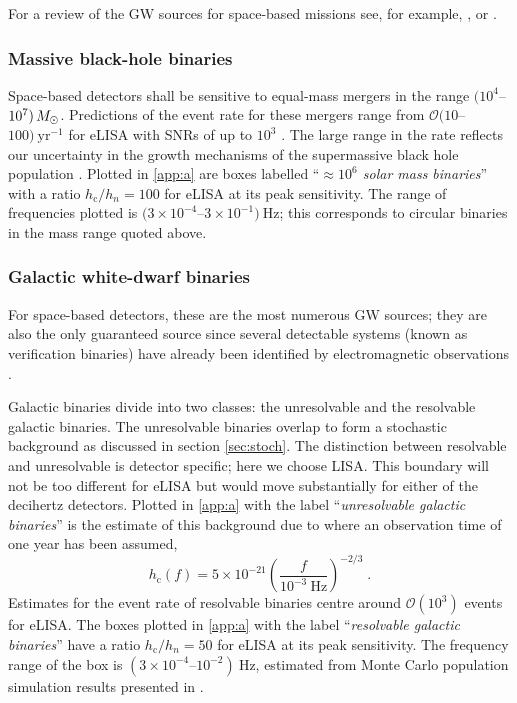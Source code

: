For a review of the GW sources for space-based missions see, for example, \citet{Amaro-Seoane-et-al}, \citet{Gairetal} or \citet{eLISAyellowbook}.

\subsubsection{Massive black-hole binaries}

Space-based detectors shall be sensitive to equal-mass mergers in the range $(10^{4}$--$10^{7})\,M_{ \odot }$. Predictions of the event rate for these mergers range from ${\mathcal{O}}(10$--$100)~\mathrm{yr}^{-1}$ for eLISA with SNRs of up to $10^3$ \citep{TheGravitationalUniverse}. The large range in the rate reflects our uncertainty in the growth mechanisms of the supermassive black hole population \citep{Volonteri2010}. Plotted in \ref{app:a} are boxes labelled ``\emph{$\mathit{\approx 10^{6}}$ solar mass binaries}'' with a ratio $h_\mathrm{c}/h_{n}=100$ for eLISA at its peak sensitivity. The range of frequencies plotted is $(3\times 10^{-4}$--$3\times 10^{-1})~\mathrm{Hz}$; this corresponds to circular binaries in the mass range quoted above.

\subsubsection{Galactic white-dwarf binaries} \label{sec:GB}

For space-based detectors, these are the most numerous GW sources; they are also the only guaranteed source since several detectable systems (known as verification binaries) have already been identified by electromagnetic observations \citep{2006CQGra..23S.809S}.

Galactic binaries divide into two classes: the unresolvable and the resolvable galactic binaries. The unresolvable binaries overlap to form a stochastic background as discussed in section \ref{sec:stoch}. The distinction between resolvable and unresolvable is detector specific; here we choose LISA. This boundary will not be too different for eLISA but would move substantially for either of the decihertz detectors. Plotted in \ref{app:a} with the label ``\emph{unresolvable galactic binaries}'' is the estimate of this background due to \citet{Nelemans} where an observation time of one year has been assumed,
\begin{equation}
h_\mathrm{c}(f)= 5\times 10^{-21} \left(\frac{f}{10^{-3}~\mathrm{Hz}}\right)^{-2/3} \; .
 \end{equation}
Estimates for the event rate of resolvable binaries centre around ${\mathcal{O}}(10^{3})$ events for eLISA. The boxes plotted in \ref{app:a} with the label ``\emph{resolvable galactic binaries}'' have a ratio $h_\mathrm{c}/h_{n}=50$ for eLISA at its peak sensitivity. The frequency range of the box is $\left(3\times10^{-4}\right.$--$\left.10^{-2}\right)~\mathrm{Hz}$, estimated from Monte Carlo population simulation results presented in \citet{Amaro-Seoane-et-al}.


